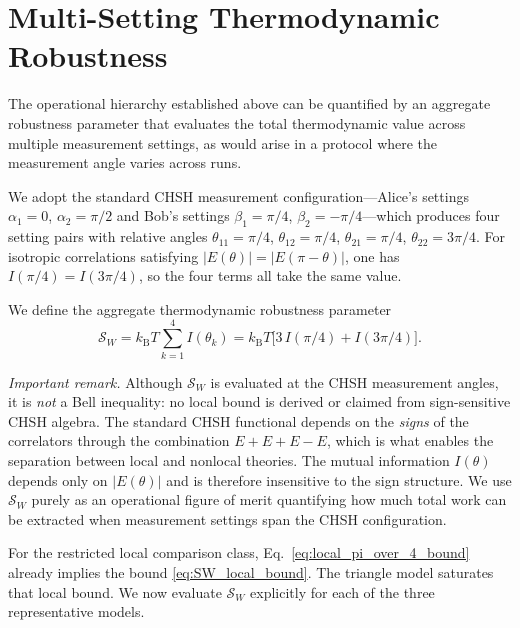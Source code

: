 \documentclass[pra,twocolumn,showpacs,preprintnumbers,amsmath,amssymb,longbibliography,
               superscriptaddress]{revtex4-2}
\begin{document}
\section{{Multi-Setting Thermodynamic Robustness}}
\label{sec:CHSH_work}

{The operational hierarchy established above can be quantified by
an aggregate robustness parameter that evaluates the total
thermodynamic value across multiple measurement settings, as would
arise in a protocol where the measurement angle varies across runs.}

{We adopt the standard CHSH measurement configuration---Alice's
settings $\alpha_1 = 0$, $\alpha_2 = \pi/2$ and Bob's settings
$\beta_1 = \pi/4$, $\beta_2 = -\pi/4$---which produces four
setting pairs with relative angles
$\theta_{11} = \pi/4$, $\theta_{12} = \pi/4$,
$\theta_{21} = \pi/4$, $\theta_{22} = 3\pi/4$.
For isotropic correlations satisfying $|E(\theta)| = |E(\pi-\theta)|$,
one has $I(\pi/4) = I(3\pi/4)$, so the four terms all take the same
value.}

{We define the aggregate thermodynamic robustness parameter
\begin{equation}
\mathcal{S}_W
  = k_{\mathrm{B}}T\sum_{k=1}^{4}
    I(\theta_k)
  = k_{\mathrm{B}}T\bigl[3\,I(\pi/4) + I(3\pi/4)\bigr].
\label{eq:SW_def}
\end{equation}}

{\emph{Important remark.}
Although $\mathcal{S}_W$ is evaluated at the CHSH measurement angles,
it is \emph{not} a Bell inequality: no local bound is derived or
claimed from sign-sensitive CHSH algebra.
The standard CHSH functional depends on the \emph{signs} of the
correlators through the combination
$E + E + E - E$, which is what enables the separation between local
and nonlocal theories.
The mutual information $I(\theta)$ depends only on $|E(\theta)|$
and is therefore insensitive to the sign structure.
We use $\mathcal{S}_W$ purely as an operational figure of merit
quantifying how much total work can be extracted when measurement
settings span the CHSH configuration.}

{For the restricted local comparison class,
Eq.~\eqref{eq:local_pi_over_4_bound} already implies the bound
\eqref{eq:SW_local_bound}.
The triangle model saturates that local bound.
We now evaluate $\mathcal{S}_W$ explicitly for each of the three
representative models.}
\end{document}
